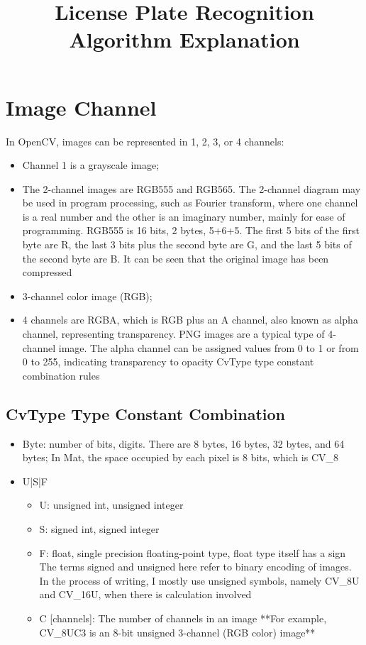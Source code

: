 \documentclass{article}
\title{License Plate Recognition Algorithm Explanation}
\begin{document}
	\maketitle
	
	\section{Image Channel}
	In OpenCV, images can be represented in 1, 2, 3, or 4 channels:
	\begin{itemize}
		\item Channel 1 is a grayscale image;
		\item The 2-channel images are RGB555 and RGB565. The 2-channel diagram may be used in program processing, such as Fourier transform, where one channel is a real number and the other is an imaginary number, mainly for ease of programming. RGB555 is 16 bits, 2 bytes, 5+6+5. The first 5 bits of the first byte are R, the last 3 bits plus the second byte are G, and the last 5 bits of the second byte are B. It can be seen that the original image has been compressed
		\item 3-channel color image (RGB);
		\item 4 channels are RGBA, which is RGB plus an A channel, also known as alpha channel, representing transparency. PNG images are a typical type of 4-channel image. The alpha channel can be assigned values from 0 to 1 or from 0 to 255, indicating transparency to opacity
		CvType type constant combination rules
	\end{itemize}
	
	\subsection{CvType Type Constant Combination}
	\begin{itemize}
		\item Byte: number of bits, digits. There are 8 bytes, 16 bytes, 32 bytes, and 64 bytes; In Mat, the space occupied by each pixel is 8 bits, which is CV\_8
		\item U|S|F
		\begin{itemize}
			\item U: unsigned int, unsigned integer
			\item S: signed int, signed integer
			\item F: float, single precision floating-point type, float type itself has a sign
			The terms signed and unsigned here refer to binary encoding of images. In the process of writing, I mostly use unsigned symbols, namely CV\_8U and CV\_16U, when there is calculation involved
			\item C [channels]: The number of channels in an image
			**For example, CV\_8UC3 is an 8-bit unsigned 3-channel (RGB color) image**
		\end{itemize}
	\end{itemize}
	
\end{document}

